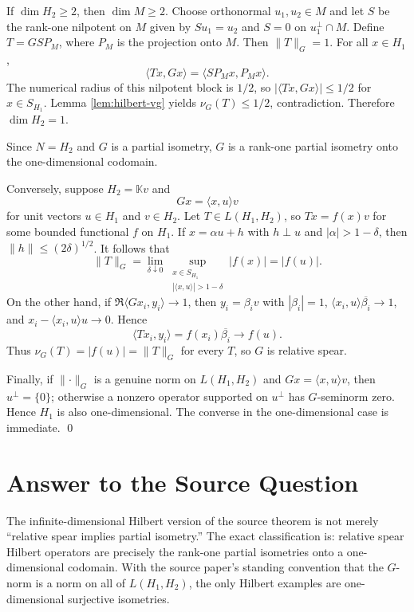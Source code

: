 \documentclass[11pt]{article}
\newcommand{\norm}[1]{\lVert #1\rVert}
\begin{document}
If $\dim H_2\ge2$, then $\dim M\ge2$.  Choose orthonormal $u_1,u_2\in M$ and
let $S$ be the rank-one nilpotent on $M$ given by
$S u_1=u_2$ and $S=0$ on $u_1^\perp\cap M$.  Define
$T=G S P_M$, where $P_M$ is the projection onto $M$.  Then $\norm{T}_G=1$.
For all $x\in H_1$,
\[
  \langle Tx,Gx\rangle
  =\langle S P_Mx,P_Mx\rangle .
\]
The numerical radius of this nilpotent block is $1/2$, so
$|\langle Tx,Gx\rangle|\le1/2$ for $x\in S_{H_1}$.  Lemma
\ref{lem:hilbert-vg} yields $\nu_G(T)\le1/2$, contradiction.  Therefore
$\dim H_2=1$.

Since $N=H_2$ and $G$ is a partial isometry, $G$ is a rank-one partial isometry
onto the one-dimensional codomain.

Conversely, suppose $H_2=\mathbb K v$ and
\[
  Gx=\langle x,u\rangle v
\]
for unit vectors $u\in H_1$ and $v\in H_2$.  Let $T\in L(H_1,H_2)$, so
$Tx=f(x)v$ for some bounded functional $f$ on $H_1$.  If
$x=\alpha u+h$ with $h\perp u$ and $|\alpha|>1-\delta$, then
$\norm{h}\le (2\delta)^{1/2}$.  It follows that
\[
  \norm{T}_G=\lim_{\delta\downarrow0}
  \sup_{\substack{x\in S_{H_1}\\ |\langle x,u\rangle|>1-\delta}} |f(x)|
  =|f(u)|.
\]
On the other hand, if
$\Re\langle Gx_i,y_i\rangle\to1$, then $y_i=\beta_i v$ with
$|\beta_i|=1$, $\langle x_i,u\rangle\overline{\beta_i}\to1$, and
$x_i-\langle x_i,u\rangle u\to0$.  Hence
\[
  \langle Tx_i,y_i\rangle
  =f(x_i)\overline{\beta_i}\to f(u).
\]
Thus $\nu_G(T)=|f(u)|=\norm{T}_G$ for every $T$, so $G$ is relative spear.

Finally, if $\norm{\cdot}_G$ is a genuine norm on $L(H_1,H_2)$ and
$Gx=\langle x,u\rangle v$, then $u^\perp=\{0\}$; otherwise a nonzero operator
supported on $u^\perp$ has $G$-seminorm zero.  Hence $H_1$ is also
one-dimensional.  The converse in the one-dimensional case is immediate.
\qed

\section*{Answer to the Source Question}

The infinite-dimensional Hilbert version of the source theorem is not merely
``relative spear implies partial isometry.''  The exact classification is:
relative spear Hilbert operators are precisely the rank-one partial isometries
onto a one-dimensional codomain.  With the source paper's standing convention
that the $G$-norm is a norm on all of $L(H_1,H_2)$, the only Hilbert examples
are one-dimensional surjective isometries.
\end{document}
